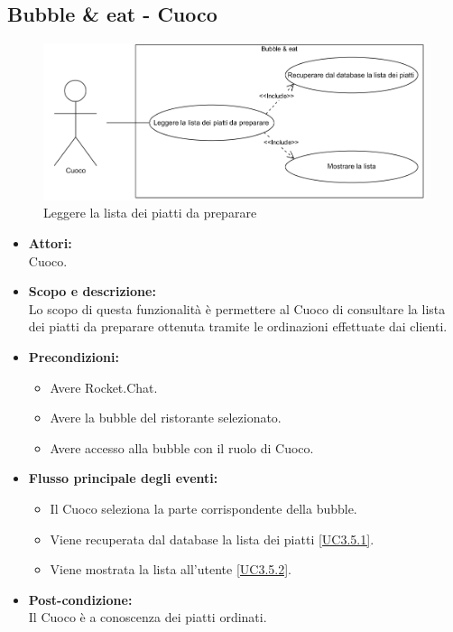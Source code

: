 \subsection{Bubble \& eat - Cuoco}


\begin{figure}[H]
	\centering
	\includegraphics[width=15cm]{../../documenti/AnalisiDeiRequisiti/Diagrammi_img/uc3_5.png}
	\caption{\UCCaption{} Leggere la lista dei piatti da preparare}
\end{figure}

\begin{itemize}
	\item \textbf{Attori:}
	\\Cuoco.
	\item \textbf{Scopo e descrizione:} 
	\\Lo scopo di questa funzionalità è permettere al Cuoco di consultare la lista dei piatti da preparare ottenuta tramite le ordinazioni effettuate dai clienti.
	\item \textbf{Precondizioni:}
	\begin{itemize}
		\item Avere Rocket.Chat.
		\item Avere la bubble del ristorante selezionato.
		\item Avere accesso alla bubble con il ruolo di Cuoco.
	\end{itemize}
	\item \textbf{Flusso principale degli eventi:}
	\begin{itemize}
		\item Il Cuoco seleziona la parte corrispondente della bubble.
		\item Viene recuperata dal database la lista dei piatti \ref{UC3.5.1}.
		\item Viene mostrata la lista all'utente \ref{UC3.5.2}.
	\end{itemize}
	\item \textbf{Post-condizione:}
	\\Il Cuoco è a conoscenza dei piatti ordinati.
\end{itemize}

